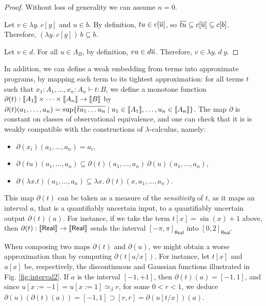 \begin{proof} Without loss of generality we can assume $n=0$.

Let $v \in \lambda y.~ c[y]$ and $u \in b$. By definition, $tu \in c[\overline{u}]$, so $\overline{tu} \subseteq c[\overline{u}] \subseteq c[b]$. Therefore, $(\lambda y.~ c[y])~ b \subseteq b$.

Let $v \in d$. For all $u \in \Lambda_B$, by definition, $vu \in d\overline{u}$. Therefore, $v \in \lambda y.~ d~ y$.
\end{proof}

In addition, we can define a weak embedding from terms into approximate programs, by mapping each term to its tightest approximation: for all terms $t$ such that $x_{1}:A_{1},\dots,x_{n}:A_{n}\vdash t:B$, we define a monotone function $\partial(t):\llbracket A_{1} \rrbracket\times \dots \times \llbracket A_{n} \rrbracket \to \llbracket B \rrbracket$ by $\partial(t)(a_1, \ldots, a_n) = \sup \{ \overline{t u_1 \ldots u_n} \mid u_1 \in \llbracket A_1 \rrbracket, \ldots, u_n \in \llbracket A_n \rrbracket \}$. The map $\partial$ is constant on classes of observational equivalence, and one can check that it is is weakly compatible with the constructions of $\lambda$-calculus, namely:
\begin{itemize}
\item $\partial (x_{i})(a_{1},\dots, a_{n})=a_{i}$,
\item $\partial (tu)(a_{1},\dots, a_{n}) \subseteq \partial (t)(a_{1},\dots, a_{n}) ~ \partial (u)(a_{1},\dots, a_{n})$,
\item $\partial (\lambda x. t)(a_{1},\dots, a_{n}) \subseteq \lambda x.~ \partial (t)(x, a_{1},\dots, a_{n})$.
\end{itemize}

This map $\partial(t)$ can be taken as a measure of the \emph{sensitivity} of $t$, as it maps an interval $a$, that is a quantifiably uncertain input, to a quantifiably uncertain output $\partial(t)(a)$. 
For instance, if we take the term $t[x]= \sin(x)+1$ above, then $\partial(t): \llbracket \mathsf{Real} \rrbracket\to \llbracket \mathsf{Real} \rrbracket$ sends the interval $[-\pi,\pi]_{\mathsf{Real}}$ into $[0,2]_{\mathsf{Real}}$.

\begin{remark}
When composing two maps $\partial(t)$ and $\partial(u)$, we might obtain a worse approximation than by computing $\partial(t[u/x])$.
For instance, let $t[x]$ and 
$u[x]$ be, respectively, the discontinuous and Gaussian functions illustrated in Fig. \ref{fig:interval2}.  
If $a$ is the interval $[-1,+1]$, then $\partial(t)(a)=[-1,1]$, and since $u[x:=-1]=u[x:=1]\simeq_{\beta} r$, for some $0<r<1$, we deduce $\partial(u)(\partial(t)(a))=[-1,1] \supset [r,r  ]= \partial (u[t/x])(a)$.

\end{remark}










